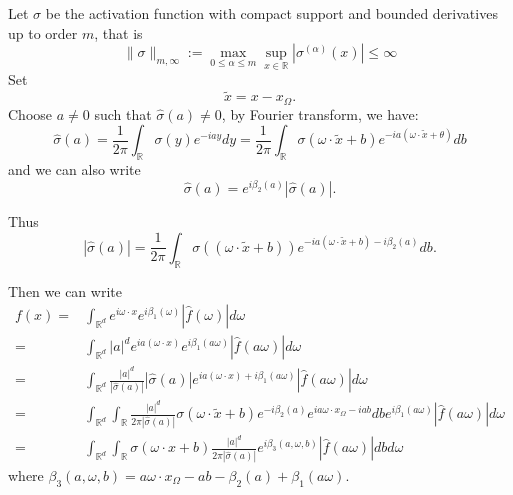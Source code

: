 Let $\sigma$ be the activation function with compact support and bounded derivatives up to order $m$, that is
\begin{equation}
\|\sigma\|_{m,\infty} := \max_{0\le\alpha\le m}\sup_{x\in\mathbb{R}}|\sigma^{(\alpha)}(x)|\le \infty
\end{equation}
Set
\begin{equation}
\label{eq:3}
\tilde x=x-x_\Omega.  
\end{equation}
Choose $a\ne0$ such that $\hat{\sigma}(a)\ne 0$, by Fourier transform, we have:
\begin{equation*}
\hat{\sigma}(a)=\frac{1}{2\pi}\int_{\mathbb{R}}\sigma(y)e^{-ia
	y}dy=\frac{1}{2\pi}\int_{\mathbb{R}}\sigma(\omega\cdot \tilde
x+b)e^{-ia(\omega\cdot \tilde x+\theta)}db
\end{equation*}
and we can also write
\begin{equation*}
\hat{\sigma}(a)=e^{i\beta_2(a)}|\hat{\sigma}(a)|.   
\end{equation*}

Thus
\begin{equation}
|\hat{\sigma}(a)|=\frac{1}{2\pi}\int_{\mathbb{R}}\sigma((\omega\cdot \tilde{x}+b ) )e^{-ia(\omega\cdot \tilde{x}+b )-i\beta_2(a)}db.   
\end{equation}

Then we can write
\begin{equation}
\begin{aligned}
f(x)=& \int_{\mathbb{R}^d}e^{i\omega\cdot x}e^{i\beta_1(\omega)}|\hat{f}(\omega)|d\omega\\
=&\int_{\mathbb{R}^d}|a|^d e^{ia(\omega\cdot x)}e^{i\beta_1(a\omega)}|\hat{f}(a\omega)|d\omega \\
=&\int_{\mathbb{R}^d}\frac{|a|^d }{ |\hat{\sigma}(a)|} |\hat{\sigma}(a)|e^{ia(\omega\cdot x)+i\beta_1(a\omega)}|\hat{f}(a\omega)|d\omega \\
=&\int_{\mathbb{R}^d}\int_{\mathbb{R}}\frac{|a|^d}{2\pi|\hat{\sigma}(a)|}\sigma(\omega\cdot \tilde{x}+b  )e^{-i\beta_2(a)}
e^{ia\omega\cdot x_\Omega-iab}db e^{i\beta_1(a\omega)}|\hat{f}(a\omega)|d\omega \\
=&\int_{\mathbb{R}^d}\int_{\mathbb{R}}\sigma(\omega\cdot x+b )\frac{|a|^d}{2\pi|\hat{\sigma}(a)|}e^{i\beta_3(a,\omega,b)}|\hat{f}(a\omega)|db d\omega
\end{aligned}
\end{equation}
where $\beta_3(a,\omega,b)=a\omega\cdot x_\Omega-ab-\beta_2(a)+\beta_1(a\omega)$.

